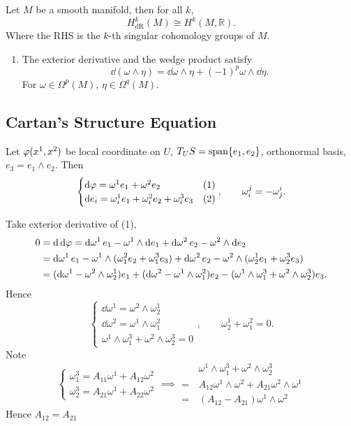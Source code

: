 \begin{theorem}[de Rham]
    Let \(M\) be a smooth manifold, then for all \(k\), \[
        H_{\text{dR}}^k(M)\cong H^k(M,\mathbb{R})
    .\] Where the RHS is the \(k\)-th singular cohomology groups of \(M\).
\end{theorem}

\begin{enumerate}[(3)]
\item The exterior derivative and the wedge product satisfy \[
    \dd{(\omega\wedge \eta)}=\dd{\omega}\wedge \eta+(-1)^p\omega\wedge \dd{\eta}
.\] For \(\omega\in \Omega^p(M)\), \(\eta\in \Omega^q(M)\).
\end{enumerate}

\subsection{Cartan's Structure Equation}
Let \(\varphi(x^1,x^2)\) be local coordinate on \(U\), \(T_US=\operatorname{span}\{e_1,e_2\}\),
orthonormal basis, \(e_3=e_1\wedge e_2\). Then \[
    \begin{cases}
        \dd{\varphi}=\omega^1e_1+\omega^2e_2 & (1)\\
        \dd{e_i}=\omega_i^1e_1+\omega_i^2e_2+\omega_i^3e_3 & (2)
    \end{cases},\qquad\omega_i^j=-\omega_j^i
.\]

Take exterior derivative of (1),
\begin{align*}
    0&=\dd{\dd{\varphi}}=\dd{\omega^1}e_1-\omega^1\wedge\dd{e_1}+\dd{\omega^2}e_2
    -\omega^2\wedge\dd{e_2} \\
    &=\dd{\omega^1}e_1-\omega^1\wedge(\omega_1^2e_2+\omega_1^3e_3)+\dd{\omega^2}e_2
    -\omega^2\wedge(\omega_2^1e_1+\omega_2^3e_3) \\
    &=(\dd{\omega^1}-\omega^2\wedge \omega_2^1)e_1+(\dd{\omega^2}-\omega^1\wedge 
    \omega_1^2)e_2-(\omega^1\wedge \omega_1^3+\omega^2\wedge \omega_2^3)e_3
.\end{align*}
Hence
\begin{equation}\label{eq:structure1}
    \begin{cases}
        \dd{\omega^1}=\omega^2\wedge \omega_2^1 \\
        \dd{\omega^2}=\omega^1\wedge \omega_1^2 \\
        \omega^1\wedge \omega_1^3+\omega^2\wedge \omega_2^3=0
    \end{cases},\qquad \omega_2^1+\omega_1^2=0
.\end{equation}
Note \[
    \begin{cases}
        \omega_1^3=A_{11}\omega^1+A_{12}\omega^2 \\ 
        \omega_2^3=A_{21}\omega^1+A_{22}\omega^2
    \end{cases}\implies \boxed{\begin{aligned}
        &\,\omega^1\wedge \omega_1^3+\omega^2\wedge \omega_2^3 \\
        =&\,A_{12}\omega^1\wedge \omega^2+A_{21}\omega^2\wedge \omega^1 \\
        =&\,(A_{12}-A_{21})\omega^1\wedge \omega^2
    \end{aligned}}
\] Hence \(A_{12}=A_{21}\)


